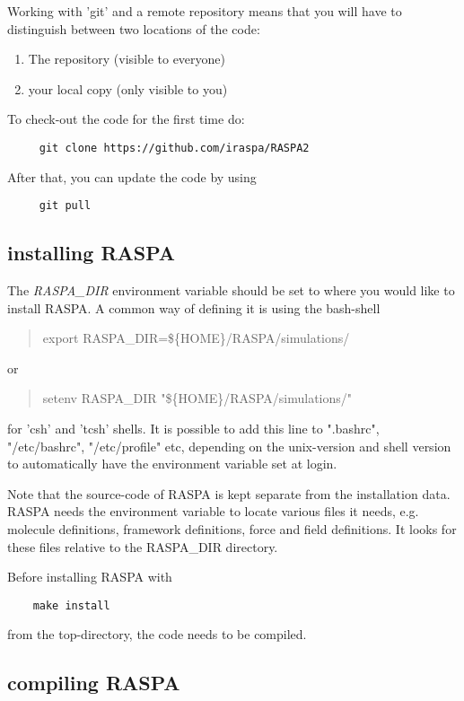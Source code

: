 Working with 'git' and a remote repository  means that you will have to distinguish between two locations of the code:
\begin{enumerate}
 \item{The repository (visible to everyone)}
 \item{your local copy (only visible to you)}
\end{enumerate}

To check-out the code for the first time do:
\begin{verbatim}
     git clone https://github.com/iraspa/RASPA2
\end{verbatim}
After that, you can update the code by using
\begin{verbatim}
     git pull
\end{verbatim}

\subsection{installing RASPA}

The \emph{RASPA\_DIR} environment variable should be set to where you would like to install RASPA.
A common way of defining it is using the bash-shell
\begin{quote}
  export RASPA\_DIR=\$\{HOME\}/RASPA/simulations/
\end{quote}
or
\begin{quote}
  setenv RASPA\_DIR "\$\{HOME\}/RASPA/simulations/"
\end{quote}
for 'csh' and 'tcsh' shells.
It is possible to add this line to ".bashrc", "/etc/bashrc", "/etc/profile" etc, depending on the unix-version and
shell version to automatically have the environment variable set at login.

Note that the source-code of RASPA is kept separate from the installation data. RASPA needs the environment variable to
locate various files it needs, e.g. molecule definitions, framework definitions, force and field definitions.
It looks for these files relative to the RASPA\_DIR directory.

Before installing RASPA with
\begin{verbatim}
    make install
\end{verbatim}
from the top-directory, the code needs to be compiled.

\subsection{compiling RASPA}

